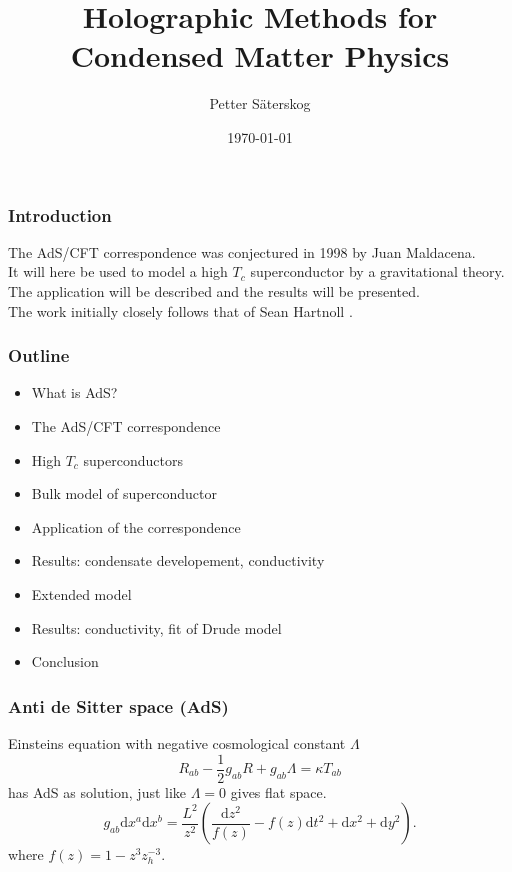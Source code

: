 \documentclass{beamer}
\renewcommand{\d}{\ensuremath{\mathrm{d}}}
\begin{document}
\title{Holographic Methods for Condensed Matter Physics}   
\author{Petter Säterskog} 
\date{\today} 

\frame{\titlepage} 

\begin{frame}
\frametitle{Introduction}
The AdS/CFT correspondence was conjectured in 1998 by Juan Maldacena.\\

It will here be used to model a high $T_c$ superconductor by a gravitational theory.\\

The application will be described and the results will be presented.\\

The work initially closely follows that of Sean Hartnoll \cite{hartnoll8}.
\end{frame}

\begin{frame}
\frametitle{Outline}
\begin{itemize}
  \item What is AdS?
  \item The AdS/CFT correspondence
  \item High $T_c$ superconductors
  \item Bulk model of superconductor
  \item Application of the correspondence
  \item Results: condensate developement, conductivity
  \item Extended model
  \item Results: conductivity, fit of Drude model
  \item Conclusion
  \end{itemize}
\end{frame}

\begin{frame}
\frametitle{Anti de Sitter space (AdS)}
Einsteins equation with negative cosmological constant $\Lambda$
\begin{equation}
R_{ab}-\frac{1}{2}g_{ab}R+g_{ab}\Lambda=\kappa T_{ab}\label{einstein}
\end{equation}
has AdS as solution, just like $\Lambda=0$ gives flat space.
\begin{equation}
 g_{ab}\d x^a\d x^b=\frac{L^2}{z^2}\left(\frac{\d z^2}{f(z)}-f(z)\d t^2+\d x^2+\d y^2\right).\label{metric}
\end{equation}
where $f(z)=1-z^3z_h^{-3}$.
\end{frame}
\end{document}
